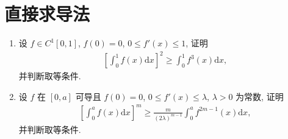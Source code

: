 \documentclass[../../main.tex]{subfiles}
\begin{document}
\section{直接求导法}

\begin{example}
\begin{enumerate}
\item 设 $f \in C^1[0,1]$, $f(0) = 0$, $0 \leqslant f'(x) \leqslant 1$, 证明
\begin{align*}
\left[\int_{0}^{1}f(x)\mathrm{d}x\right]^2 \geqslant \int_{0}^{1}f^3(x)\mathrm{d}x,
\end{align*}
并判断取等条件.

\item 设 $f$ 在 $[0,a]$ 可导且 $f(0) = 0$, $0 \leqslant f'(x) \leqslant \lambda$, $\lambda > 0$ 为常数, 证明
\begin{align}\label{equation-section03-16.24}
\left[\int_{0}^{a}f(x)\mathrm{d}x\right]^m \geqslant \frac{m}{(2\lambda)^{m - 1}}\int_{0}^{a}f^{2m - 1}(x)\mathrm{d}x,
\end{align}
并判断取等条件.
\end{enumerate}
\end{example}
\end{document}

